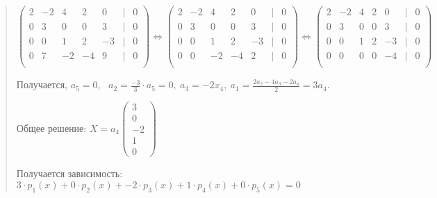 \documentclass{article}
\begin{document}
\begin{quote}
   $
   \begin{pmatrix}
       2 & -2 & 4 & 2 & 0 & | & 0 \\
       0 & 3 & 0 & 0 & 3 & | & 0 \\
       0 & 0 & 1 & 2 & -3 & | & 0 \\
       0 & 7 & -2 & -4 & 9 & | & 0 \\
   \end{pmatrix}
   \Leftrightarrow
      \begin{pmatrix}
       2 & -2 & 4 & 2 & 0 & | & 0 \\
       0 & 3 & 0 & 0 & 3 & | & 0 \\
       0 & 0 & 1 & 2 & -3 & | & 0 \\
       0 & 0 & -2 & -4 & 2 & | & 0 \\
   \end{pmatrix}
   \Leftrightarrow
         \begin{pmatrix}
       2 & -2 & 4 & 2 & 0 & | & 0 \\
       0 & 3 & 0 & 0 & 3 & | & 0 \\
       0 & 0 & 1 & 2 & -3 & | & 0 \\
       0 & 0 & 0 & 0 & -4 & | & 0 \\
   \end{pmatrix}
   $

   Получается, $a_5 = 0$, \ $a_2 = \frac{-3}{3} \cdot a_5 = 0, \ a_3 = -2 x_4, \ a_1 = \frac{2a_2 -4a_3 - 2a_4}{2} = 3 a_4$.
   
    Общее решение: $X = a_4 \begin{pmatrix} 3 \\ 0 \\ -2 \\ 1 \\ 0 \end{pmatrix}$

    Получается зависимость: $\boxed{3 \cdot p_1(x) + 0 \cdot p_2(x) + -2 \cdot p_3(x) + 1 \cdot p_4(x) + 0 \cdot p_5(x) = 0}$
\end{quote}
\end{document}
